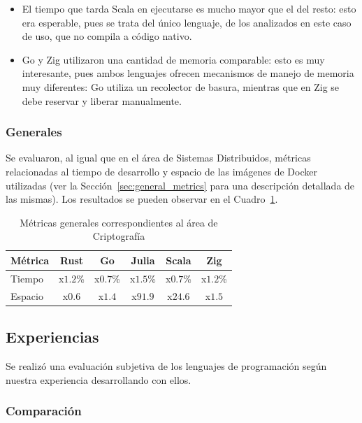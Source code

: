 \documentclass[11pt]{article}
\let\Oldsubsection\subsection
\renewcommand{\subsection}{\FloatBarrier\Oldsubsection}
\let\Oldsubsubsection\subsubsection
\renewcommand{\subsubsection}{\FloatBarrier\Oldsubsubsection}
\begin{document}
\begin{itemize}
    \item El tiempo que tarda Scala en ejecutarse es mucho mayor que el del resto: esto era esperable, pues se trata del único lenguaje, de los analizados en este caso de uso, que no compila a código nativo.
    \item Go y Zig utilizaron una cantidad de memoria comparable: esto es muy interesante, pues ambos lenguajes ofrecen mecanismos de manejo de memoria muy diferentes: Go utiliza un recolector de basura, mientras que en Zig se debe reservar y liberar manualmente.
\end{itemize}

\subsubsection{Generales}

Se evaluaron, al igual que en el área de Sistemas Distribuidos, métricas relacionadas al tiempo de desarrollo y espacio de las imágenes de Docker utilizadas (ver la Sección~\ref{sec:general_metrics} para una descripción detallada de las mismas). Los resultados se pueden observar en el Cuadro~\ref{tab:aes:relative_general_metrics}.

\begin{table}[h]
\centering
\begin{tabular}{|l|c|c|c|c|c|}
\hline
\multicolumn{1}{|c|}{Métrica} & Rust & Go & Julia & Scala & Zig \\ \hline
Tiempo & x$1.2$\% & x$0.7$\% & x$1.5$\% & x$0.7$\% & x$1.2$\% \\ \hline
Espacio & x$0.6$ & x$1.4$ & x$91.9$ & x$24.6$ & x$1.5$ \\ \hline
\end{tabular}
\caption{Métricas generales correspondientes al área de Criptografía}
\label{tab:aes:relative_general_metrics}
\end{table}

\subsection{Experiencias}

Se realizó una evaluación subjetiva de los lenguajes de programación según nuestra experiencia desarrollando con ellos.

\subsubsection{Comparación}
\end{document}
